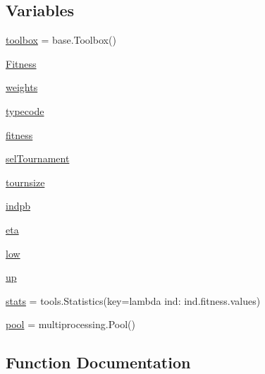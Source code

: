 \subsection*{Variables}
\begin{DoxyCompactItemize}
\item 
\hyperlink{namespacecode_1_1_g_a_model_p___a_v_r_aada4f2b1955c75829ce7666b65f1d64c}{toolbox} = base.\+Toolbox()
\item 
\hyperlink{namespacecode_1_1_g_a_model_p___a_v_r_ad0e24db7e538c760b931674cd964d42b}{Fitness}
\item 
\hyperlink{namespacecode_1_1_g_a_model_p___a_v_r_a23500f115cb36eb62f05a9b6ce845e33}{weights}
\item 
\hyperlink{namespacecode_1_1_g_a_model_p___a_v_r_a8ba332ee0d895afa17012d1a732a762f}{typecode}
\item 
\hyperlink{namespacecode_1_1_g_a_model_p___a_v_r_ac71f9f1415378acbbe9bf8f11e8427ea}{fitness}
\item 
\hyperlink{namespacecode_1_1_g_a_model_p___a_v_r_af4c5b1064ae8cb3088ebc679a252f668}{sel\+Tournament}
\item 
\hyperlink{namespacecode_1_1_g_a_model_p___a_v_r_a065641ff21adefe5c007d82b9ceee55a}{tournsize}
\item 
\hyperlink{namespacecode_1_1_g_a_model_p___a_v_r_ac5158b72a11a8d5d8496b7345ae71b81}{indpb}
\item 
\hyperlink{namespacecode_1_1_g_a_model_p___a_v_r_a6464be2da11db3ebe3986118deaa9be5}{eta}
\item 
\hyperlink{namespacecode_1_1_g_a_model_p___a_v_r_a8b4c4e4544bfe7c568aedaaafc79febc}{low}
\item 
\hyperlink{namespacecode_1_1_g_a_model_p___a_v_r_ace90f84537fcabf735ceb1680716dee9}{up}
\item 
\hyperlink{namespacecode_1_1_g_a_model_p___a_v_r_a07fc233c6cd1acf2183ae25f4b3b0b1f}{stats} = tools.\+Statistics(key=lambda ind\+: ind.\+fitness.\+values)
\item 
\hyperlink{namespacecode_1_1_g_a_model_p___a_v_r_a12e12e88bbdbb6d15879d3bd0302ab39}{pool} = multiprocessing.\+Pool()
\end{DoxyCompactItemize}


\subsection{Function Documentation}
\mbox{\label{namespacecode_1_1_g_a_model_p___a_v_r_ae008eef98ea5f21ea46b555bff16501b}} 

